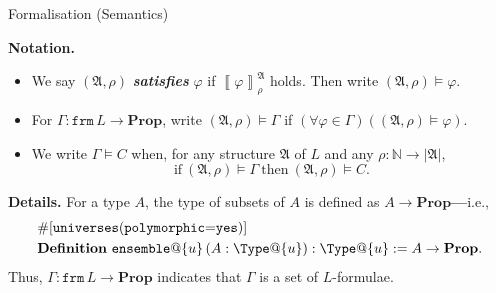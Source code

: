 \documentclass[serif,table,10pt]{beamer}
\newcommand{\IN}{\mathbb{N}}
\newcommand{\0}{\texttt{0}}
\newcommand{\1}{\texttt{1}}
\newcommand{\inlinedef}[1]{\emph{\textbf{#1}}}
\newcommand{\Prop}{\mathbf{Prop}}
\begin{document}
\begin{frame}{Formalisation (Semantics)}

    \textbf{Notation.}
    \begin{itemize}
        \item We say $ ( \mathfrak{ A } , \rho ) $ \inlinedef{satisfies} $ \varphi $ if $ \left\llbracket \varphi \right\rrbracket_\rho^\mathfrak{A} $ holds. Then write $( \mathfrak{ A } , \rho ) \models \varphi $.
        \item For $\Gamma : \mathtt{frm} \, L \to \Prop$, write $ ( \mathfrak{ A } , \rho ) \models \Gamma $ if $ (\forall \varphi \in \Gamma) ( ( \mathfrak{ A } , \rho ) \models \varphi ) $.
        \item We write $ \Gamma \vDash C $ when, for any structure $\mathfrak{A}$ of $L$ and any $\rho : \IN \to | \mathfrak{A} |$, \[ \mathrm{if} \  ( \mathfrak{ A } , \rho ) \models \Gamma \  \mathrm{then} \  ( \mathfrak{ A } , \rho ) \models C . \]
    \end{itemize}

    \textbf{Details.}
    For a type $A$, the type of subsets of $A$ is defined as $A \to \Prop$\textbf{---}i.e.,
    \begin{align*}
        & \mathtt{\#[universes(polymorphic\hbox{=}yes)]} \\
        & \mathbf{Definition} \  \mathtt{ensemble}@\{ u \} \, ( A : \Type@\{ u \}) : \Type@\{ u \} := A \to \Prop .
    \end{align*}
    Thus, $\Gamma : \mathtt{frm} \, L \to \Prop$ indicates that $\Gamma$ is a set of $L$-formulae.

\end{frame}
\end{document}
